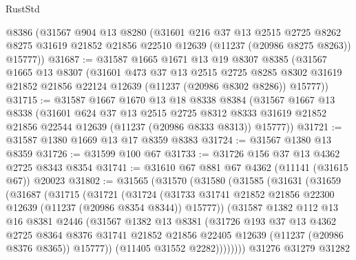 \begin{lexlean}{RustStd}
\begin{coremodule}
    @8386
    (@31567
      @904
      @13
      @8280
      (@31601
        @216
        @37
        @13
        @2515
        @2725
        @8262
        @8275
        @31619
        @21852
        @21856
        @22510
        @12639
        (@11237 (@20986 @8275 @8263))
        @15777))
@31687 := @31587
    @1665
    @1671
    @13
    @19
    @8307
    @8385
    (@31567
      @1665
      @13
      @8307
      (@31601
        @473
        @37
        @13
        @2515
        @2725
        @8285
        @8302
        @31619
        @21852
        @21856
        @22124
        @12639
        (@11237 (@20986 @8302 @8286))
        @15777))
@31715 := @31587
    @1667
    @1670
    @13
    @18
    @8338
    @8384
    (@31567
      @1667
      @13
      @8338
      (@31601
        @624
        @37
        @13
        @2515
        @2725
        @8312
        @8333
        @31619
        @21852
        @21856
        @22544
        @12639
        (@11237 (@20986 @8333 @8313))
        @15777))
@31721 := @31587 @1380 @1669 @13 @17 @8359 @8383
@31724 := @31567 @1380 @13 @8359
@31726 := @31599 @100 @67
@31733 := @31726 @156 @37 @13 @4362 @2725 @8343 @8354
@31741 := @31610 @67 @881 @67 @4362 (@11141 (@31615 @67)) @20023
@31802 := @31565
    (@31570
      (@31580
        (@31585
          (@31631
            (@31659
              (@31687
                (@31715
                  (@31721
                    (@31724
                      (@31733
                        @31741
                        @21852
                        @21856
                        @22300
                        @12639
                        (@11237 (@20986 @8354 @8344))
                        @15777))
                    (@31587
                      @1382
                      @112
                      @13
                      @16
                      @8381
                      @2446
                      (@31567
                        @1382
                        @13
                        @8381
                        (@31726
                          @193
                          @37
                          @13
                          @4362
                          @2725
                          @8364
                          @8376
                          @31741
                          @21852
                          @21856
                          @22405
                          @12639
                          (@11237 (@20986 @8376 @8365))
                          @15777))
                      (@11405 @31552 @2282))))))))
        @31276
        @31279
        @31282

\end{coremodule}
\end{lexlean}

